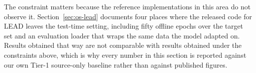 The constraint matters because the reference implementations in this area do not observe
it. Section~\ref{sec:os-lead} documents four places where the released code for LEAD
leaves the test-time setting, including fifty offline epochs over the target set and an
evaluation loader that wraps the same data the model adapted on. Results obtained that way
are not comparable with results obtained under the constraints above, which is why every
number in this section is reported against our own Tier-1 source-only baseline rather than
against published figures.
